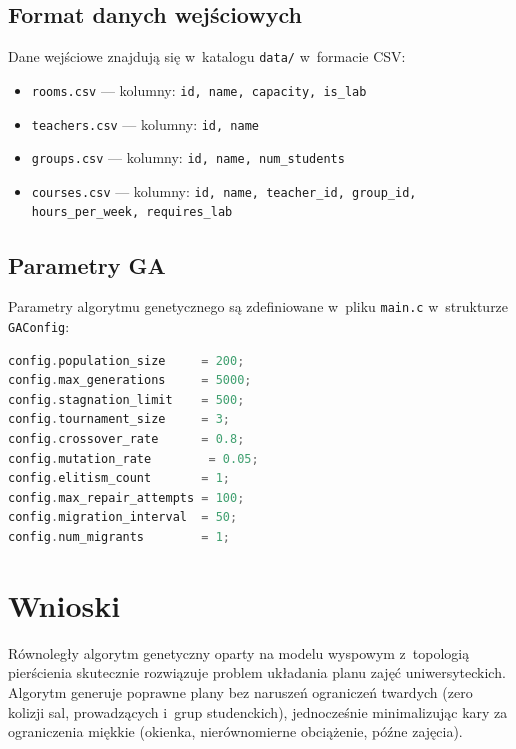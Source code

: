 \documentclass[12pt,a4paper]{article}
\begin{document}
\subsection{Format danych wej\'{s}ciowych}

Dane wej\'{s}ciowe znajduj\k{a} si\k{e} w~katalogu \texttt{data/} w~formacie CSV:

\begin{itemize}
  \item \texttt{rooms.csv} --- kolumny: \texttt{id, name, capacity, is\_lab}
  \item \texttt{teachers.csv} --- kolumny: \texttt{id, name}
  \item \texttt{groups.csv} --- kolumny: \texttt{id, name, num\_students}
  \item \texttt{courses.csv} --- kolumny: \texttt{id, name, teacher\_id, group\_id, hours\_per\_week, requires\_lab}
\end{itemize}

\subsection{Parametry GA}

Parametry algorytmu genetycznego s\k{a} zdefiniowane w~pliku \texttt{main.c} w~strukturze \texttt{GAConfig}:

\begin{lstlisting}[language=C, numbers=none]
config.population_size     = 200;
config.max_generations     = 5000;
config.stagnation_limit    = 500;
config.tournament_size     = 3;
config.crossover_rate      = 0.8;
config.mutation_rate        = 0.05;
config.elitism_count       = 1;
config.max_repair_attempts = 100;
config.migration_interval  = 50;
config.num_migrants        = 1;
\end{lstlisting}

\section{Wnioski}

R\'{o}wnoleg\l{}y algorytm genetyczny oparty na modelu wyspowym z~topologi\k{a} pier\'{s}cienia skutecznie rozwi\k{a}zuje problem uk\l{}adania planu zaj\k{e}\'{c} uniwersyteckich. Algorytm generuje poprawne plany bez narusze\'{n} ogranicze\'{n} twardych (zero kolizji sal, prowadz\k{a}cych i~grup studenckich), jednocze\'{s}nie minimalizuj\k{a}c kary za ograniczenia mi\k{e}kkie (okienka, nier\'{o}wnomierne obci\k{a}\.{z}enie, p\'{o}\'{z}ne zaj\k{e}cia).
\end{document}
